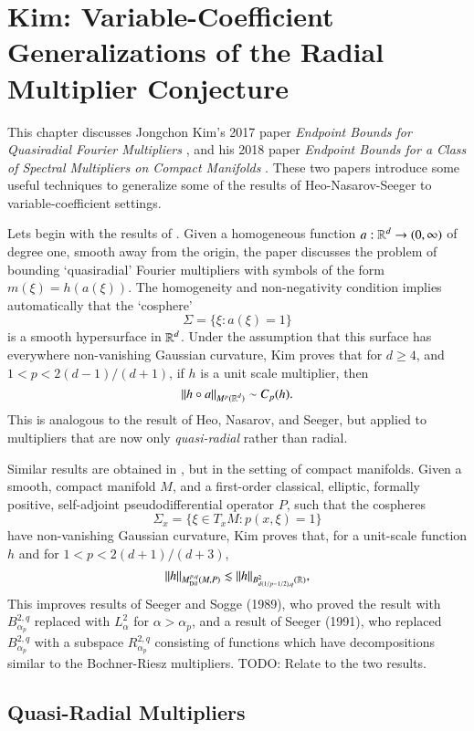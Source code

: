 \chapter[Kim: Variable Coefficient Generalizations of the RMC]{Kim: Variable-Coefficient Generalizations of the Radial Multiplier Conjecture}

This chapter discusses Jongchon Kim's 2017 paper \emph{Endpoint Bounds for Quasiradial Fourier Multipliers} \cite{KimQuasiradial}, and his 2018 paper \emph{Endpoint Bounds for a Class of Spectral Multipliers on Compact Manifolds} \cite{KimSpectral}. These two papers introduce some useful techniques to generalize some of the results of Heo-Nasarov-Seeger to variable-coefficient settings.

Lets begin with the results of \cite{KimQuasiradial}. Given a homogeneous function $a: \operatorname{\mathbb{R}}^d \to (0,\infty)$ of degree one, smooth away from the origin, the paper discusses the problem of bounding `quasiradial' Fourier multipliers with symbols of the form $m(\xi) = h(a(\xi))$. The homogeneity and non-negativity condition implies automatically that the `cosphere'
%
\[ \Sigma = \{ \xi : a(\xi) = 1 \} \]
%
is a smooth hypersurface in $\operatorname{\mathbb{R}}^d$. Under the assumption that this surface has everywhere non-vanishing Gaussian curvature, Kim proves that for $d \geq 4$, and $1 < p < 2(d-1)/(d+1)$, if $h$ is a unit scale multiplier, then
%
\[ \| h \circ a \|_{M^p(\operatorname{\mathbb{R}}^d)} \sim C_p(h). \]
%
This is analogous to the result of Heo, Nasarov, and Seeger, but applied to multipliers that are now only \emph{quasi-radial} rather than radial.

Similar results are obtained in \cite{KimSpectral}, but in the setting of compact manifolds. Given a smooth, compact manifold $M$, and a first-order classical, elliptic, formally positive, self-adjoint pseudodifferential operator $P$, such that the cospheres
%
\[ \Sigma_x = \{ \xi \in T_x M : p(x,\xi) = 1 \} \]
%
have non-vanishing Gaussian curvature, Kim proves that, for a unit-scale function $h$ and for $1 < p < 2(d+1)/(d+3)$,
%
\[ \| h \|_{M^{p,q}_{\text{Dil}}(M,P)} \lesssim \| h \|_{B^2_{d(1/p - 1/2),q}(\operatorname{\mathbb{R}})}, \]
%
This improves results of Seeger and Sogge (1989), who proved the result with $B^{2,q}_{\alpha_p}$ replaced with $L^2_\alpha$ for $\alpha > \alpha_p$, and a result of Seeger (1991), who replaced $B^{2,q}_{\alpha_p}$ with a subspace $R^{2,q}_{\alpha_p}$ consisting of functions which have decompositions similar to the Bochner-Riesz multipliers. TODO: Relate to the two results.

\section{Quasi-Radial Multipliers}

